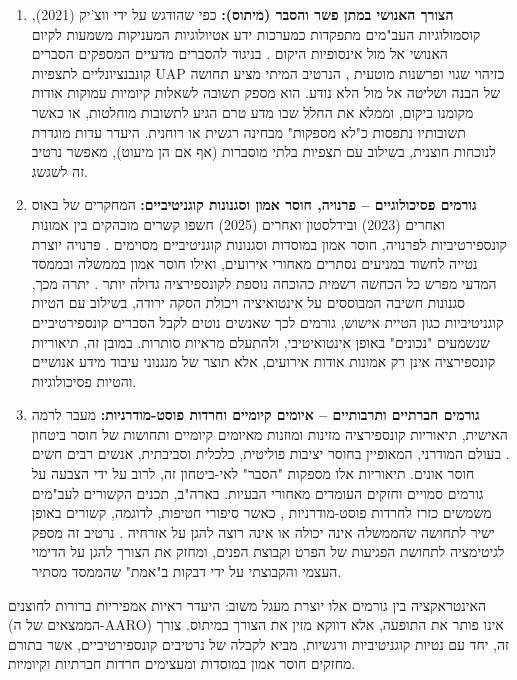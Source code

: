 \documentclass[12pt,a4paper]{article}
\begin{document}
\begin{enumerate}
    \item \textbf{הצורך האנושי במתן פשר והסבר (מיתוס):} כפי שהודגש על ידי ווצ'יק (2021), קוסמולוגיות העב"מים מתפקדות כמערכות ידע אטיולוגיות המעניקות משמעות לקיום האנושי אל מול אינסופיות היקום \cite{wojcik2021cosmologies}. בניגוד להסברים מדעיים המספקים הסברים קונבנציונליים לתצפיות UAP כזיהוי שגוי ופרשנות מוטעית \cite{aaro2024misidentification}, הנרטיב המיתי מציע תחושה של הבנה ושליטה אל מול הלא נודע. הוא מספק תשובה לשאלות קיומיות עמוקות אודות מקומנו ביקום, וממלא את החלל שבו מדע טרם הגיע לתשובות מוחלטות, או כאשר תשובותיו נתפסות כ"לא מספקות" מבחינה רגשית או רוחנית. היעדר עדות מוגדרת לנוכחות חוצנית, בשילוב עם תצפיות בלתי מוסברות (אף אם הן מיעוט), מאפשר נרטיב זה לשגשג.
    \item \textbf{גורמים פסיכולוגיים – פרנויה, חוסר אמון וסגנונות קוגניטיביים:} המחקרים של באוס ואחרים (2023) ובידלסטון ואחרים (2025) חשפו קשרים מובהקים בין אמונות קונספירטיביות לפרנויה, חוסר אמון במוסדות וסגנונות קוגניטיביים מסוימים \cite{bowes2023conspiracy, biddlestone2025conspiracy}. פרנויה יוצרת נטייה לחשוד במניעים נסתרים מאחורי אירועים, ואילו חוסר אמון בממשלה ובממסד המדעי מפרש כל הכחשה רשמית כהוכחה נוספת לקונספירציה גדולה יותר \cite{aaro2024noevidence}. יתרה מכך, סגנונות חשיבה המבוססים על אינטואיציה ויכולת הסקה ירודה, בשילוב עם הטיות קוגניטיביות כגון הטיית אישוש, גורמים לכך שאנשים נוטים לקבל הסברים קונספירטיביים שנשמעים "נכונים" באופן אינטואיטיבי, ולהתעלם מראיות סותרות. במובן זה, תיאוריות קונספירציה אינן רק אמונות אודות אירועים, אלא תוצר של מנגנוני עיבוד מידע אנושיים והטיות פסיכולוגיות.
    \item \textbf{גורמים חברתיים ותרבותיים – איומים קיומיים וחרדות פוסט-מודרניות:} מעבר לרמה האישית, תיאוריות קונספירציה מזינות ומוזנות מאיומים קיומיים ותחושות של חוסר ביטחון \cite{biddlestone2025conspiracy}. בעולם המודרני, המאופיין בחוסר יציבות פוליטית, כלכלית וסביבתית, אנשים רבים חשים חוסר אונים. תיאוריות אלו מספקות "הסבר" לאי-ביטחון זה, לרוב על ידי הצבעה על גורמים סמויים וחזקים העומדים מאחורי הבעיות. בארה"ב, תכנים הקשורים לעב"מים משמשים כזרז לחרדות פוסט-מודרניות \cite{ellwood1999ufo}, כאשר סיפורי חטיפות, לדוגמה, קשורים באופן ישיר לתחושה שהממשלה אינה יכולה או אינה רוצה להגן על אזרחיה \cite{ellwood1999ufo}. נרטיב זה מספק לגיטימציה לתחושת הפגיעות של הפרט וקבוצת הפנים, ומחזק את הצורך להגן על הדימוי העצמי והקבוצתי על ידי דבקות ב"אמת" שהממסד מסתיר.
\end{enumerate}
האינטראקציה בין גורמים אלו יוצרת מעגל משוב: היעדר ראיות אמפיריות ברורות לחוצנים (הממצאים של ה-AARO) אינו פותר את התופעה, אלא דווקא מזין את הצורך במיתוס. צורך זה, יחד עם נטיות קוגניטיביות ורגשיות, מביא לקבלה של נרטיבים קונספירטיביים, אשר בתורם מחזקים חוסר אמון במוסדות ומעצימים חרדות חברתיות וקיומיות.
\end{document}
